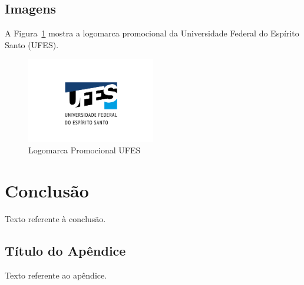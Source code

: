 \documentclass[12pt,a4paper,oneside]{abntex2}
\begin{document}
\section{Imagens}

A Figura~\ref{fig:logo_UFES} mostra a logomarca promocional da Universidade Federal do Espírito Santo (UFES).

\begin{figure}[htb]
    \caption{Logomarca Promocional UFES}
    \label{fig:logo_UFES}
    \centering
    \includegraphics[width=0.5\textwidth]{imagens/logomarca_UFES}
\end{figure}



\chapter{Conclusão}


Texto referente à conclusão.

\postextual





\begin{apendicesenv}


\chapter{Título do Apêndice}

Texto referente ao apêndice.

%

\end{apendicesenv}
\end{document}
